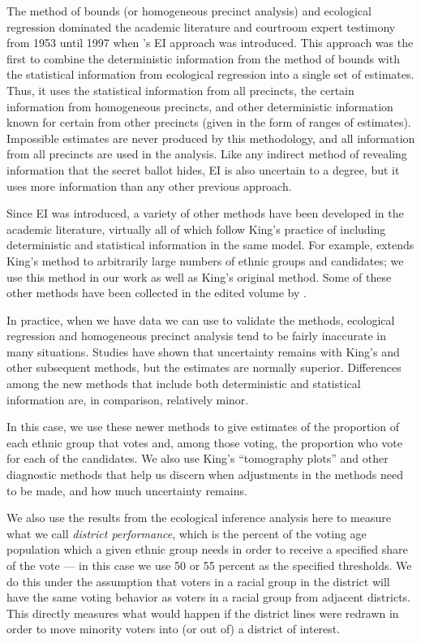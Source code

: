 \documentclass[12pt,draft]{scrartcl}
\begin{document}
The method of bounds (or homogeneous precinct analysis) and ecological
regression dominated the academic literature and courtroom expert
testimony from 1953 until 1997 when \citeauthor{king1997}'s EI
approach was introduced. This approach was the first to combine the
deterministic information from the method of bounds with the
statistical information from ecological regression into a single set
of estimates. Thus, it uses the statistical information from all
precincts, the certain information from homogeneous precincts, and
other deterministic information known for certain from other precincts
(given in the form of ranges of estimates).  Impossible estimates are
never produced by this methodology, and all information from all
precincts are used in the analysis. Like any indirect method of
revealing information that the secret ballot hides, EI is also
uncertain to a degree, but it uses more information than any other
previous approach. 

Since EI was introduced, a variety of other methods have been
developed in the academic literature, virtually all of which follow
King's practice of including deterministic and statistical information
in the same model.  For example, \citet{king2001} extends King's
method to arbitrarily large numbers of ethnic groups and candidates;
we use this method in our work as well as King's original method. Some
of these other methods have been collected in the edited volume by
\citet{king2004}.

In practice, when we have data we can use to validate the methods,
ecological regression and homogeneous precinct analysis tend to be
fairly inaccurate in many situations. Studies have shown that
uncertainty remains with King's and other subsequent methods, but the
estimates are normally superior. Differences among the new methods
that include both deterministic and statistical information are, in
comparison, relatively minor.

In this case, we use these newer methods to give estimates of the
proportion of each ethnic group that votes and, among those voting,
the proportion who vote for each of the candidates. We also use King's
``tomography plots'' and other diagnostic methods that help us discern
when adjustments in the methods need to be made, and how much
uncertainty remains.  

We also use the results from the ecological inference analysis here to
measure what we call \emph{district performance}, which is the percent
of the voting age population which a given ethnic group needs in order
to receive a specified share of the vote --- in this case we use 50 or
55 percent as the specified thresholds. We do this under the
assumption that voters in a racial group in the district will have the
same voting behavior as voters in a racial group from adjacent
districts.  This directly measures what would happen if the district
lines were redrawn in order to move minority voters into (or out of) a
district of interest.
\end{document}
